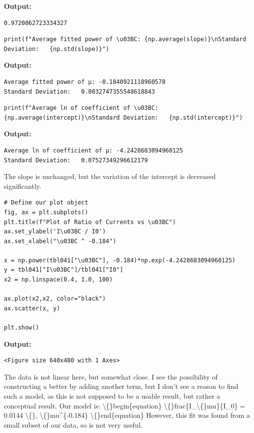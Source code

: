 \documentclass{article}
\begin{document}
\textbf{Output:}\begin{verbatim}
0.9720862723334327

\end{verbatim}

\begin{lstlisting}
print(f"Average fitted power of \u03BC: {np.average(slope)}\nStandard Deviation:   {np.std(slope)}")\end{lstlisting}

\textbf{Output:}\begin{verbatim}
Average fitted power of μ: -0.1840921118960578
Standard Deviation:   0.0032747355548618843

\end{verbatim}

\begin{lstlisting}
print(f"Average ln of coefficient of \u03BC: {np.average(intercept)}\nStandard Deviation:   {np.std(intercept)}")\end{lstlisting}

\textbf{Output:}\begin{verbatim}
Average ln of coefficient of μ: -4.2428683094960125
Standard Deviation:   0.07527349296612179

\end{verbatim}

The slope is unchanged, but the variation of the intercept is decreased significantly. 

\begin{lstlisting}
# Define our plot object
fig, ax = plt.subplots()
plt.title(f"Plot of Ratio of Currents vs \u03BC")
ax.set_ylabel('I\u03BC / I0')
ax.set_xlabel("\u03BC ^ -0.184")

x = np.power(tbl041["\u03BC"], -0.184)*np.exp(-4.2428683094960125)
y = tbl041["I\u03BC"]/tbl041["I0"]
x2 = np.linspace(0.4, 1.0, 100)

ax.plot(x2,x2, color="black")
ax.scatter(x, y)

plt.show()\end{lstlisting}

\textbf{Output:}\begin{verbatim}
<Figure size 640x480 with 1 Axes>
\end{verbatim}

The data is not linear here, but somewhat close. I see the possibility of constructing a better by adding another term, but I don't see a reason to find such a model, as this is not supposed to be a usable result, but rather a conceptual result. 
Our model is:
\textbackslash\{\}begin\{equation\}
\textbackslash\{\}frac\{I\_\textbackslash\{\}mu\}\{I\_0\} = 0.0144 \textbackslash\{\}, \textbackslash\{\}mu\textasciicircum{}\{-0.184\} 
\textbackslash\{\}end\{equation\}
However, this fit was found from a small subset of our data, so is not very useful.
\end{document}
